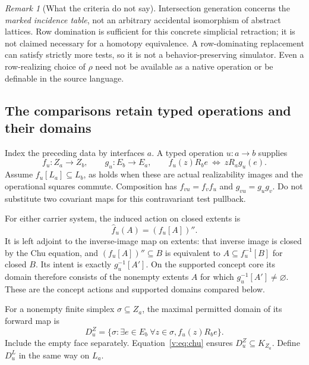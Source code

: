 \documentclass[11pt]{article}
\theoremstyle{definition}
\theoremstyle{remark}\newtheorem{remark}[theorem]{Remark}
\begin{document}
\begin{remark}[What the criteria do not say]
Intersection generation concerns the \emph{marked incidence table}, not
an arbitrary accidental isomorphism of abstract lattices. Row domination
is sufficient for this concrete simplicial retraction; it is not claimed
necessary for a homotopy equivalence. A row-dominating replacement can
satisfy strictly more tests, so it is not a behavior-preserving simulator.
Even a row-realizing choice of $\rho$ need not be available as a native
operation or be definable in the source language.
\end{remark}

\subsection{The comparisons retain typed operations and their domains}
Index the preceding data by interfaces $a$. A typed operation $u:a\to b$
supplies
\begin{equation}
 f_u:Z_a\to Z_b,\qquad g_u:E_b\to E_a,
 \qquad f_u(z)R_b e\ \Longleftrightarrow\ zR_a g_u(e).
 \label{v:eq:chu}
\end{equation}
Assume $f_u[L_a]\subseteq L_b$, as holds when these are actual
realizability images and the operational squares commute. Composition has
$f_{vu}=f_vf_u$ and $g_{vu}=g_ug_v$. Do not substitute two covariant maps
for this contravariant test pullback.

For either carrier system, the induced action on closed extents is
\[
 \widehat f_u(A)=(f_u[A])''.
\]
It is left adjoint to the inverse-image map on extents: that inverse image
is closed by the Chu equation, and
$(f_u[A])''\subseteq B$ is equivalent to $A\subseteq f_u^{-1}[B]$ for
closed $B$. Its intent is exactly $g_u^{-1}[A']$. On the supported concept
core its domain therefore consists of the nonempty extents $A$ for which
$g_u^{-1}[A']\ne\varnothing$. These are the concept actions and supported
domains compared below.


For a nonempty finite simplex $\sigma\subseteq Z_a$, the maximal
permitted domain of its forward map is
\begin{equation}
 D_u^Z=\{\sigma:\exists e\in E_b\ \forall z\in\sigma,
                  f_u(z)R_be\}.
 \label{v:eq:domain}
\end{equation}
Include the empty face separately. Equation~\eqref{v:eq:chu} ensures $D_u^Z\subseteq
K_{Z_a}$. Define $D_u^L$ in the same way on $L_a$.
\end{document}

